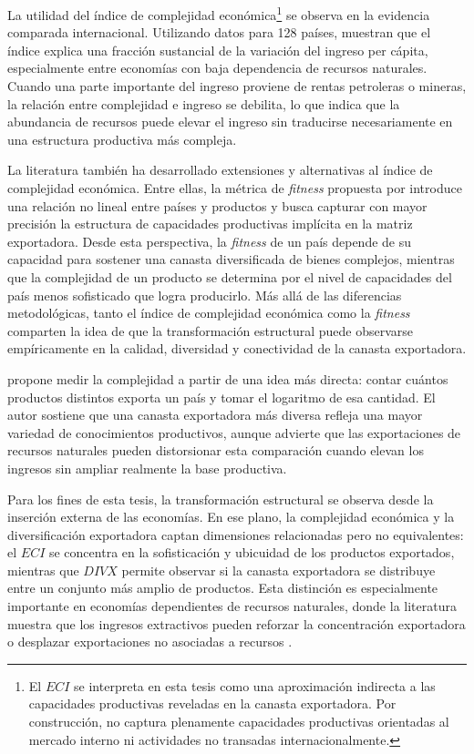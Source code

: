 \documentclass[../../TFM.tex]{subfiles}
\begin{document}
	La utilidad del índice de complejidad económica\footnote{El $ECI$ se interpreta en esta tesis como una aproximación indirecta a las capacidades productivas reveladas en la canasta exportadora. Por construcción, no captura plenamente capacidades productivas orientadas al mercado interno ni actividades no transadas internacionalmente.} se observa en la evidencia comparada internacional. Utilizando datos para 128 países, \textcite{Hausmann2014} muestran que el índice explica una fracción sustancial de la variación del ingreso per cápita, especialmente entre economías con baja dependencia de recursos naturales. Cuando una parte importante del ingreso proviene de rentas petroleras o mineras, la relación entre complejidad e ingreso se debilita, lo que indica que la abundancia de recursos puede elevar el ingreso sin traducirse necesariamente en una estructura productiva más compleja.
	
	La literatura también ha desarrollado extensiones y alternativas al índice de complejidad económica. Entre ellas, la métrica de \emph{fitness} propuesta por \textcite{Tacchella2012,Tacchella2013} introduce una relación no lineal entre países y productos y busca capturar con mayor precisión la estructura de capacidades productivas implícita en la matriz exportadora. Desde esta perspectiva, la \emph{fitness} de un país depende de su capacidad para sostener una canasta diversificada de bienes complejos, mientras que la complejidad de un producto se determina por el nivel de capacidades del país menos sofisticado que logra producirlo. Más allá de las diferencias metodológicas, tanto el índice de complejidad económica como la \emph{fitness} comparten la idea de que la transformación estructural puede observarse empíricamente en la calidad, diversidad y conectividad de la canasta exportadora.

	\textcite{Inoua2023} propone medir la complejidad a partir de una idea más directa: contar cuántos productos distintos exporta un país y tomar el logaritmo de esa cantidad. El autor sostiene que una canasta exportadora más diversa refleja una mayor variedad de conocimientos productivos, aunque advierte que las exportaciones de recursos naturales pueden distorsionar esta comparación cuando elevan los ingresos sin ampliar realmente la base productiva.
	
	Para los fines de esta tesis, la transformación estructural se observa desde la inserción externa de las economías. En ese plano, la complejidad económica y la diversificación exportadora captan dimensiones relacionadas pero no equivalentes: el $ECI$ se concentra en la sofisticación y ubicuidad de los productos exportados, mientras que $DIVX$ permite observar si la canasta exportadora se distribuye entre un conjunto más amplio de productos. Esta distinción es especialmente importante en economías dependientes de recursos naturales, donde la literatura muestra que los ingresos extractivos pueden reforzar la concentración exportadora o desplazar exportaciones no asociadas a recursos \parencite{Harding2016,Bahar2018}.
	
\end{document}
